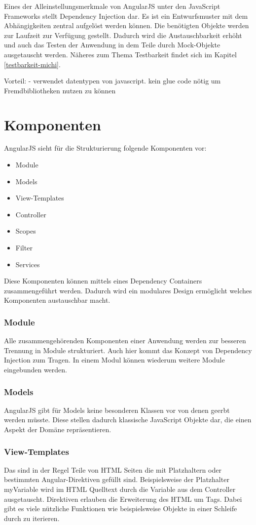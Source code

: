 Eines der Alleinstellungsmerkmale von AngularJS unter den JavaScript Frameworks stellt Dependency Injection dar.
Es ist ein Entwurfsmuster mit dem Abhängigkeiten zentral aufgelöst werden können.
Die benötigten Objekte werden zur Laufzeit zur Verfügung gestellt.
Dadurch wird die Austauschbarkeit erhöht und auch das Testen der Anwendung in dem Teile durch Mock-Objekte ausgetauscht werden.
Näheres zum Thema Testbarkeit findet sich im Kapitel \ref{testbarkeit-michi}.

Vorteil:
- verwendet datentypen von javascript. kein glue code nötig um Fremdbibliotheken nutzen zu können


\section{Komponenten}
AngularJS sieht für die Strukturierung folgende Komponenten vor:
\begin{itemize}
	\item Module
	\item Models
	\item View-Templates
	\item Controller
	\item Scopes
	\item Filter
	\item Services
\end{itemize}
Diese Komponenten können mittels eines Dependency Containers zusammengeführt werden.
Dadurch wird ein modulares Design ermöglicht welches Komponenten austauschbar macht.

\subsubsection{Module}
Alle zusammengehörenden Komponenten einer Anwendung werden zur besseren Trennung in Module strukturiert.
Auch hier kommt das Konzept von Dependency Injection zum Tragen.
In einem Modul können wiederum weitere Module eingebunden werden.

\subsubsection{Models}
AngularJS gibt für Models keine besonderen Klassen vor von denen geerbt werden müsste.
Diese stellen dadurch klassische JavaScript Objekte dar, die einen Aspekt der Domäne repräsentieren.

\subsubsection{View-Templates}
Das sind in der Regel Teile von HTML Seiten die mit Platzhaltern oder bestimmten Angular-Direktiven gefüllt sind.
Beispielsweise der Platzhalter {{myVariable}} wird im HTML Quelltext durch die Variable aus dem Controller ausgetauscht.
Direktiven erlauben die Erweiterung des HTML um Tags.
Dabei gibt es viele nützliche Funktionen wie beispielsweise Objekte in einer Schleife durch zu iterieren. 

